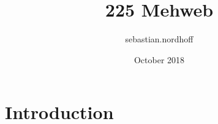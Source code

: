 \documentclass{article}
\title{225 Mehweb}
\author{sebastian.nordhoff }
\date{October 2018}
\begin{document}
\maketitle

\section{Introduction}
\end{document}

